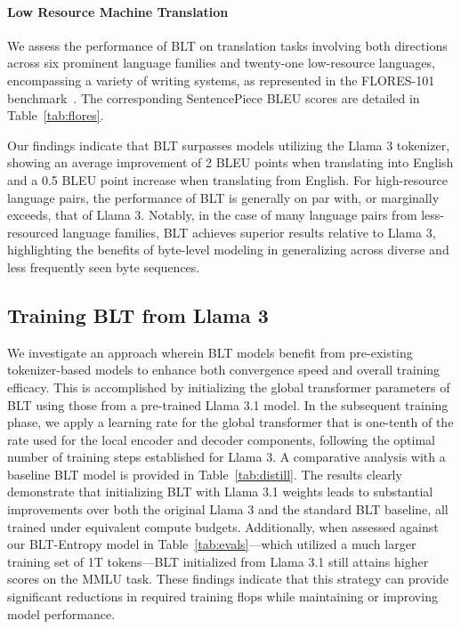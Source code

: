 \paragraph{Low Resource Machine Translation} We assess the performance of {\textsc BLT} on translation tasks involving both directions across six prominent language families and twenty-one low-resource languages, encompassing a variety of writing systems, as represented in the FLORES-101 benchmark~\citep{goyal2022flores}. The corresponding SentencePiece BLEU scores are detailed in Table~\ref{tab:flores}. 

Our findings indicate that {\textsc BLT} surpasses models utilizing the Llama 3 tokenizer, showing an average improvement of 2 BLEU points when translating into English and a 0.5 BLEU point increase when translating from English. For high-resource language pairs, the performance of {\textsc BLT} is generally on par with, or marginally exceeds, that of Llama 3. Notably, in the case of many language pairs from less-resourced language families, {\textsc BLT} achieves superior results relative to Llama 3, highlighting the benefits of byte-level modeling in generalizing across diverse and less frequently seen byte sequences.

\subsection{Training {\textsc BLT} from Llama 3}
\label{sec:distillation}
We investigate an approach wherein {\textsc BLT} models benefit from pre-existing tokenizer-based models to enhance both convergence speed and overall training efficacy. This is accomplished by initializing the global transformer parameters of {\textsc BLT} using those from a pre-trained Llama 3.1 model. In the subsequent training phase, we apply a learning rate for the global transformer that is one-tenth of the rate used for the local encoder and decoder components, following the optimal number of training steps established for Llama 3. A comparative analysis with a baseline {\textsc BLT} model is provided in Table~\ref{tab:distill}. The results clearly demonstrate that initializing {\textsc BLT} with Llama 3.1 weights leads to substantial improvements over both the original Llama 3 and the standard {\textsc BLT} baseline, all trained under equivalent compute budgets. Additionally, when assessed against our {\textsc BLT}-Entropy model in Table~\ref{tab:evals}—which utilized a much larger training set of 1T tokens—{\textsc BLT} initialized from Llama 3.1 still attains higher scores on the MMLU task. These findings indicate that this strategy can provide significant reductions in required training flops while maintaining or improving model performance.

